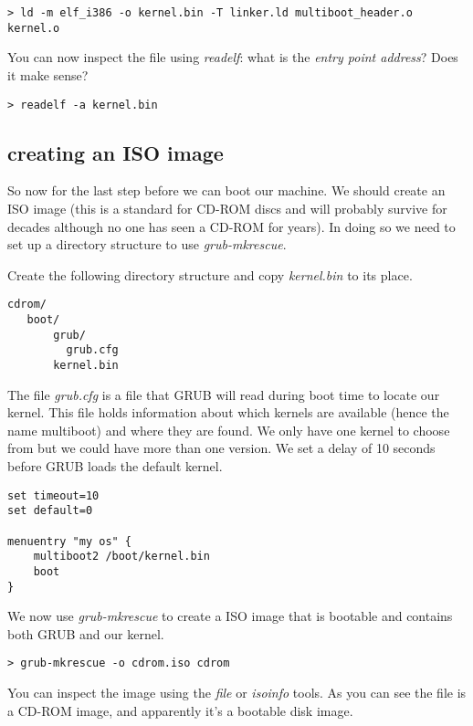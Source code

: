 \documentclass[a4paper,11pt]{article}
\begin{document}
\begin{verbatim}
> ld -m elf_i386 -o kernel.bin -T linker.ld multiboot_header.o kernel.o
\end{verbatim}

You can now inspect the file using {\em readelf}: what is the {\em
  entry point address}? Does it make sense?

\begin{verbatim}
> readelf -a kernel.bin
\end{verbatim}

\subsection{creating an ISO image}

So now for the last step before we can boot our machine. We should
create an ISO image (this is a standard for CD-ROM discs and will probably
survive for decades although no one has seen a CD-ROM for years). In
doing so we need to set up a directory structure to use {\em
  grub-mkrescue}.

Create the following directory structure and copy {\em kernel.bin} to
its place.

\begin{verbatim}
cdrom/
   boot/
       grub/
         grub.cfg
       kernel.bin
\end{verbatim}

The file {\em grub.cfg} is a file that GRUB will read during boot time
to locate our kernel. This file holds information about which kernels
are available (hence the name multiboot) and where they are found. We
only have one kernel to choose from but we could have more than one
version. We set a delay of 10 seconds before GRUB loads the default
kernel.

\begin{verbatim}
set timeout=10
set default=0

menuentry "my os" {
    multiboot2 /boot/kernel.bin
    boot
}
\end{verbatim}

We now use {\em grub-mkrescue} to create a ISO image that is bootable
and contains both GRUB and our kernel.

\begin{verbatim}
> grub-mkrescue -o cdrom.iso cdrom
\end{verbatim}


You can inspect the image using the {\em file} or {\em isoinfo}
tools. As you can see the file is a CD-ROM image, and apparently it's a
bootable disk image. 
\end{document}
